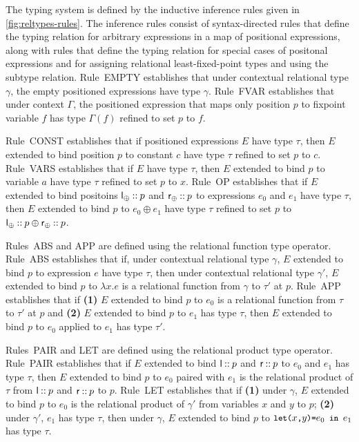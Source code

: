 The typing system is defined by the inductive inference rules given in
\autoref{fig:reltypes-rules}.
%
The inference rules consist of syntax-directed rules that define the
typing relation for arbitrary expressions in a map of positional
expressions, along with rules that define the typing relation for
special cases of positonal expressions and for assigning relational
least-fixed-point types and using the subtype relation.
Rule~EMPTY establishes that under contextual relational type $\gamma$,
the empty positioned expressions have type $\gamma$.
Rule~FVAR establishes that under context $\Gamma$, the positioned
expression that maps only position $p$ to fixpoint variable $f$ has
type $\Gamma(f)$ refined to set $p$ to $f$.

Rule~CONST establishes that if positioned expressions $E$ have type
$\tau$, then $E$ extended to bind position $p$ to constant $c$ have
type $\tau$ refined to set $p$ to $c$.
Rule~VARS establishes that if $E$ have type $\tau$, then $E$ extended
to bind $p$ to variable $a$ have type $\tau$ refined to set $p$ to
$x$.
Rule~OP establishes that if $E$ extended to bind positoins
$\mathsf{l}_{\oplus} \mathbin{::} p$ and $\mathsf{r}_{\oplus} \mathbin{::} p$ to expressions
$e_0$ and $e_1$ have type $\tau$, then $E$ extended to bind $p$ to
$e_0 \oplus e_1$ have type $\tau$ refined to set $p$ to
$\mathsf{l}_{\oplus} \mathbin{::} p \oplus \mathsf{r}_{\oplus} \mathbin{::} p$.

Rules~ABS and APP are defined using the relational function type
operator.
%
Rule~ABS establishes that if, under contextual relational type
$\gamma$, $E$ extended to bind $p$ to expression $e$ have type $\tau$,
then under contextual relational type $\gamma'$, $E$ extended to bind
$p$ to $\lambda x. e$ is a relational function from $\gamma$ to
$\tau'$ at $p$.
Rule~APP establishes that if %
\textbf{(1)} $E$ extended to bind $p$ to $e_0$ is a relational
function from $\tau$ to $\tau'$ at $p$ and %
\textbf{(2)} $E$ extended to bind $p$ to $e_1$ has type $\tau$, then
$E$ extended to bind $p$ to $e_0$ applied to $e_1$ has type $\tau'$.

Rules~PAIR and LET are defined using the relational product type
operator.
Rule~PAIR establishes that if $E$ extended to bind
$\mathsf{l} \mathbin{::} p$ and $\mathsf{r} \mathbin{::} p$ to $e_0$ and $e_1$ has
type $\tau$, then $E$ extended to bind $p$ to $e_0$ paired with $e_1$
is the relational product of $\tau$ from $\mathsf{l} \mathbin{::} p$ and
$\mathsf{r} \mathbin{::} p$ to $p$.
Rule~LET establishes that if %
\textbf{(1)} under $\gamma$, $E$ extended to bind $p$ to $e_0$ is the
relational product of $\gamma'$ from variables $x$ and $y$ to $p$;
%
\textbf{(2)} under $\gamma'$, $e_1$ has type $\tau$, then under
$\gamma$, $E$ extended to bind $p$ to $\letexp{x}{y}{e_0}{e_1}$ has
type $\tau$.

